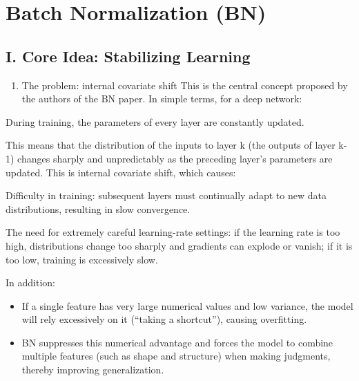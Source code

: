\setcounter{section}{2}

\hypertarget{batch-normalization-bn}{%
\section{Batch Normalization (BN)}\label{batch-normalization-bn}}

\hypertarget{i.-core-idea-stabilizing-learning}{%
\subsection{I. Core Idea: Stabilizing Learning}\label{i.-core-idea-stabilizing-learning}}

\begin{enumerate}
\def\labelenumi{\arabic{enumi}.}
\tightlist
\item
  The problem: internal covariate shift
  This is the central concept proposed by the authors of the BN paper. In simple terms, for a deep network:
\end{enumerate}

During training, the parameters of every layer are constantly updated.

This means that the distribution of the inputs to layer k (the outputs of layer k-1) changes sharply and unpredictably as the preceding layer's parameters are updated. This is internal covariate shift, which causes:

Difficulty in training: subsequent layers must continually adapt to new data distributions, resulting in slow convergence.

The need for extremely careful learning-rate settings: if the learning rate is too high, distributions change too sharply and gradients can explode or vanish; if it is too low, training is excessively slow.

In addition:

\begin{itemize}
\item
  If a single feature has very large numerical values and low variance, the model will rely excessively on it (``taking a shortcut''), causing overfitting.
\item
  BN suppresses this numerical advantage and forces the model to combine multiple features (such as shape and structure) when making judgments, thereby improving generalization.
\end{itemize}

